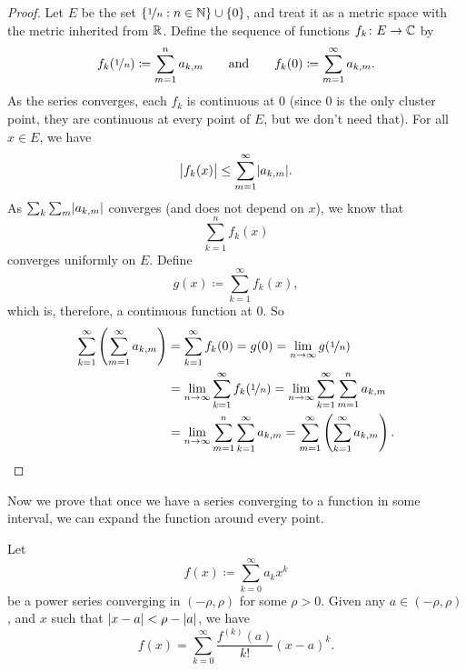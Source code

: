 \begin{proof}
Let $E$ be the set $\{ \nicefrac{1}{n} : n \in {\mathbb{N}} \} \cup \{ 0 \}$,
and treat it as a metric space with the metric inherited from ${\mathbb{R}}$.
Define the sequence of functions $f_k \colon E \to {\mathbb{C}}$
by
\begin{equation*}
f_k(\nicefrac{1}{n}) \coloneqq \sum_{m=1}^n a_{k,m}
\qquad
\text{and}
\qquad
f_k(0) \coloneqq \sum_{m=1}^\infty a_{k,m} .
\end{equation*}
As the series converges, each $f_k$ is continuous at $0$
(since 0 is the only cluster point, they are continuous at every point of
$E$, but we don't need that).
For all $x \in E$, we have
\begin{equation*}
\bigl\lvert {f_k(x)} \bigr\rvert \leq \sum_{m=1}^\infty \lvert {a_{k,m}} \rvert .
\end{equation*}
As $\sum_k \sum_m \lvert {a_{k,m}} \rvert$ converges (and does not depend on
$x$), we know that
\begin{equation*}
\sum_{k=1}^n f_k(x)
\end{equation*}
converges uniformly on $E$.  Define
\begin{equation*}
g(x) \coloneqq \sum_{k=1}^\infty f_k(x) ,
\end{equation*}
which is, therefore, a continuous function at $0$.
So
\begin{equation*}
\begin{split}
\sum_{k=1}^\infty \left( \sum_{m=1}^\infty a_{k,m} \right)
& =
\sum_{k=1}^\infty f_k(0)
= g(0)
= \lim_{n\to\infty} g(\nicefrac{1}{n}) \\
&= 
\lim_{n\to\infty}\sum_{k=1}^\infty f_k(\nicefrac{1}{n})
= 
\lim_{n\to\infty}\sum_{k=1}^\infty \sum_{m=1}^n a_{k,m} \\
&= 
\lim_{n\to\infty}\sum_{m=1}^n \sum_{k=1}^\infty a_{k,m}
= 
\sum_{m=1}^\infty \left( \sum_{k=1}^\infty a_{k,m} \right) . \qedhere
\end{split}
\end{equation*}
\end{proof}

Now we prove that once we have a series converging to a function
in some interval, we can expand the function around every point.

\begin{thm}
%
\label{thm:tayloranal}
Let
\begin{equation*}
f(x) \coloneqq \sum_{k=0}^\infty a_k x^k
\end{equation*}
be a power series converging in $(-\rho,\rho)$ for some $\rho > 0$.  Given any $a \in
(-\rho,\rho)$,
and $x$ such that $\lvert {x-a} \rvert < \rho-\lvert {a} \rvert$, we have
\begin{equation*}
f(x) =
\sum_{k=0}^\infty \frac{f^{(k)}(a)}{k!} {(x-a)}^{k} .
\end{equation*}
\end{thm}

